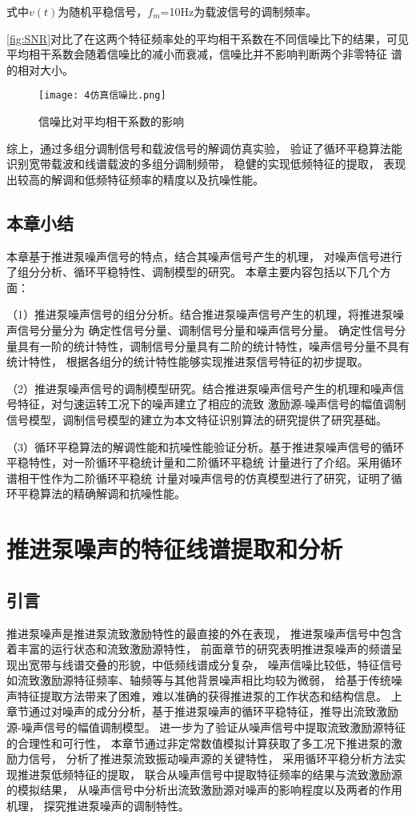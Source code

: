 式中$v\left ( t \right )$为随机平稳信号，$f_m$=10Hz为载波信号的调制频率。

\autoref{fig:SNR}对比了在这两个特征频率处的平均相干系数在不同信噪比下的结果，可见
平均相干系数会随着信噪比的减小而衰减，信噪比并不影响判断两个非零特征
谱的相对大小。

\begin{figure}[htbp]
    \centering
    \texttt{[image: 4仿真信噪比.png]}
    \caption{\label{fig:SNR}信噪比对平均相干系数的影响
    }
\end{figure}

综上，通过多组分调制信号和载波信号的解调仿真实验，
验证了循环平稳算法能识别宽带载波和线谱载波的多组分调制频带，
稳健的实现低频特征的提取，
表现出较高的解调和低频特征频率的精度以及抗噪性能。
\section{本章小结}
本章基于推进泵噪声信号的特点，结合其噪声信号产生的机理，
对噪声信号进行了组分分析、循环平稳特性、调制模型的研究。
本章主要内容包括以下几个方面：

（1）推进泵噪声信号的组分分析。结合推进泵噪声信号产生的机理，将推进泵噪声信号分量分为
确定性信号分量、调制信号分量和噪声信号分量。
确定性信号分量具有一阶的统计特性，调制信号分量具有二阶的统计特性，噪声信号分量不具有统计特性，
根据各组分的统计特性能够实现推进泵信号特征的初步提取。 

（2）推进泵噪声信号的调制模型研究。结合推进泵噪声信号产生的机理和噪声信号特征，对匀速运转工况下的噪声建立了相应的流致
激励源-­噪声信号的幅值调制信号模型，调制信号模型的建立为本文特征识别算法的研究提供了研究基础。 

（3）循环平稳算法的解调性能和抗噪性能验证分析。基于推进泵噪声信号的循环平稳特性，对一阶循环平稳统计量和二阶循环平稳统
计量进行了介绍。采用循环谱相干性作为二阶循环平稳统
计量对噪声信号的仿真模型进行了研究，证明了循环平稳算法的精确解调和抗噪性能。

\chapter{推进泵噪声的特征线谱提取和分析}
\section{引言}
推进泵噪声是推进泵流致激励特性的最直接的外在表现，
推进泵噪声信号中包含着丰富的运行状态和流致激励源特性，
前面章节的研究表明推进泵噪声的频谱呈现出宽带与线谱交叠的形貌，中低频线谱成分复杂，
噪声信噪比较低，特征信号如流致激励源特征频率、轴频等与其他背景噪声相比均较为微弱，
给基于传统噪声特征提取方法带来了困难，难以准确的获得推进泵的工作状态和结构信息。
上章节通过对噪声的成分分析，基于推进泵噪声的循环平稳特征，推导出流致激励源-噪声信号的幅值调制模型。
进一步为了验证从噪声信号中提取流致激励源特征的合理性和可行性，
本章节通过非定常数值模拟计算获取了多工况下推进泵的激励力信号，
分析了推进泵流致振动噪声源的关键特性，
采用循环平稳分析方法实现推进泵低频特征的提取，
联合从噪声信号中提取特征频率的结果与流致激励源的模拟结果，
从噪声信号中分析出流致激励源对噪声的影响程度以及两者的作用机理，
探究推进泵噪声的调制特性。
